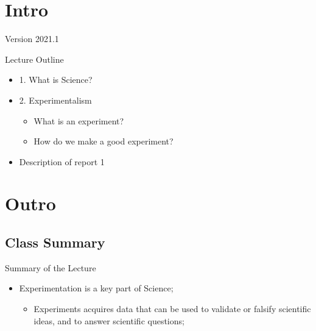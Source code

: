\documentclass{beamer}
\subtitle[Experimentalism]{Topic 01 - What is an experiment?}
\begin{document}
\begin{CJK}{UTF8}{ipxm}

\section{Intro}
\begin{frame}
  \maketitle

  \vfill

  \hfill Version 2021.1
\end{frame}

\begin{frame}{Lecture Outline}
  \begin{itemize}
    \item 1. What is Science?\bigskip

    \item 2. Experimentalism
    \begin{itemize}
      \item What is an experiment?
      \item How do we make a good experiment?
    \end{itemize}\bigskip
    
    \item Description of report 1
  \end{itemize}
\end{frame}




\section{Outro}

\subsection{Class Summary}
\begin{frame}{Summary of the Lecture}
  \begin{itemize}
    \item Experimentation is a key part of Science;
    \begin{itemize}
      \item Experiments acquires data that can be used to validate or falsify scientific ideas, and to answer scientific questions;
    \end{itemize}
    \bigskip


\end{itemize}
\end{frame}
\end{CJK}
\end{document}
